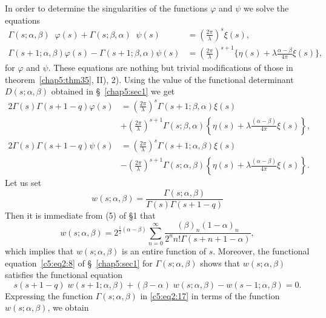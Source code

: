 In order to determine the singularities of the functions $\varphi$ and
$\psi$ we solve the equations
\begin{align*}
\Gamma(s;\alpha,\beta) \;\;  \varphi(s) + \Gamma(s;\beta, \alpha)
\;\;\psi(s) & = (\frac{2\pi}{\lambda})^s \xi(s),\\
\Gamma(s+1;\alpha,\beta) \varphi(s) -\Gamma(s+1;\beta,\alpha) \psi(s)
& = (\frac{2\pi}{\lambda})^{s+1}
\{\eta(s)+\lambda\frac{\alpha-\beta}{4\pi} \xi(s)\}, 
\end{align*}
for \pageoriginale $\varphi$ and $\psi$. These equations are nothing
but trivial modifications of those in theorem~\ref{chap5:thm35}, II), 2). Using the
value of the functional determinant $D(s;\alpha,\beta)$ obtained in
\S~\ref{chap5:sec1} we get
\begin{align*}
2\Gamma(s) \Gamma(s+1-q) \varphi(s) & = (\frac{2\pi}{\lambda})^s
\Gamma(s+1;\beta, \alpha) \xi(s)\\ 
&+ (\frac{2\pi}{\lambda})^{s+1}
\Gamma(s;\beta,\alpha) \left\{\eta(s)+ \lambda\frac{(\alpha-\beta)}{4\pi}
\xi (s)\right\}, \\
2\Gamma(s) \Gamma(s+1-q) \psi (s) & = (\frac{2\pi}{\lambda})^s
\Gamma(s+1;\alpha,\beta)\xi(s)\\
& -(\frac{2\pi}{\lambda})^{s+1}
\Gamma(s;\alpha,\beta) \left\{\eta(s)+ \lambda \frac{(\alpha-\beta)}{4\pi}
\xi(s)\right\}. \tag{17}\label{c5:eq2:17}
\end{align*}
Let us set 
\begin{equation*}
w(s;\alpha,\beta)
=\frac{\Gamma(s;\alpha,\beta)}
{\Gamma(s)\Gamma(s+1-q)} \tag{18}\label{c5:eq2:18}
\end{equation*}
Then it is immediate from (5) of \S 1 that
\begin{equation*}
w(s;\alpha,\beta) = 2^{\frac{1}{2}(\alpha-\beta)} \sum^{\infty}_{n=0}
\frac{(\beta)_n(1-\alpha)_n}{2^n n!
\Gamma(s+n+1-\alpha)}, \tag{19}\label{c5:eq2:19}
\end{equation*}
which implies that $w(s;\alpha,\beta)$ is an entire function of
$s$. Moreover, the functional equation~\eqref{c5:eq2:8} of \S~\ref{chap5:sec1} for
$\Gamma(s;\alpha,\beta)$ shows that $w(s;\alpha,\beta)$ satisfies the
functional equation 
\begin{equation*}
s(s+1-q) \; w(s+1;\alpha,\beta) + (\beta-\alpha) \; w(s;\alpha,\beta)
-w(s-1;\alpha,\beta) =0. \tag{20}\label{c5:eq2:20}
\end{equation*}
Expressing the function $\Gamma(s;\alpha,\beta)$ in \eqref{c5:eq2:17} in terms of
the function\break $w(s;\alpha,\beta)$, we obtain 
